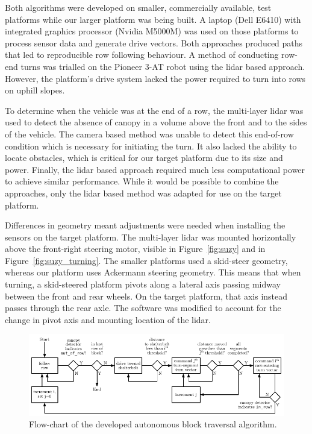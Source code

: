 \documentclass[preprint,authoryear,12pt]{elsarticle}
\begin{document}
    Both algorithms were developed on smaller, commercially available, test platforms while our larger platform was being built.
    A laptop (Dell E6410) with integrated graphics processor (Nvidia M5000M) was used on those platforms to process sensor data and generate drive vectors.
    Both approaches produced paths that led to reproducible row following behaviour.
    A method of conducting row-end turns was trialled on the Pioneer 3-AT robot using the lidar based approach.
    However, the platform's drive system lacked the power required to turn into rows on uphill slopes.

    To determine when the vehicle was at the end of a row, the multi-layer lidar was used to detect the absence of canopy in a volume above the front and to the sides of the vehicle.
    The camera based method was unable to detect this end-of-row condition which is necessary for initiating the turn.
    It also lacked the ability to locate obstacles, which is critical for our target platform due to its size and power.
    Finally, the lidar based approach required much less computational power to achieve similar performance.
    While it would be possible to combine the approaches, only the lidar based method was adapted for use on the target platform.

    Differences in geometry meant adjustments were needed when installing the sensors on the target platform.
    The multi-layer lidar was mounted horizontally above the front-right steering motor, visible in Figure~\ref{fig:suzy} and in Figure~\ref{fig:suzy_turning}.
    The smaller platforms used a skid-steer geometry, whereas our platform uses Ackermann steering geometry.
    This means that when turning, a skid-steered platform pivots along a lateral axis passing midway between the front and rear wheels.
    On the target platform, that axis instead passes through the rear axle.
    The software was modified to account for the change in pivot axis and mounting location of the lidar.

    \begin{figure}[htb]
        \centering
        \includegraphics[width=\linewidth]{imgs/turning_diagrams/flowchart.pdf}
        \caption{
            Flow-chart of the developed autonomous block traversal algorithm.
        }
        \label{fig:turn_diagram}
    \end{figure}
\end{document}
